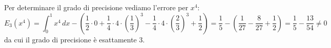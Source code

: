 \documentclass[a4paper,11pt]{article}
\begin{document}
Per determinare il grado di precisione vediamo l'errore per $x^4$:
$$
E_3(x^4) = \int_0^1 x^4 \, dx - \left( \frac{1}{2} \cdot 0 + \frac{1}{4} \cdot 4 \cdot \left( \frac{1}{3} \right)^3 - \frac{1}{4} \cdot 4 \cdot \left( \frac{2}{3} \right)^3 + \frac{1}{2} \right) = \frac{1}{5} - \left( \frac{1}{27} - \frac{8}{27} + \frac{1}{2} \right) = \frac{1}{5} - \frac{13}{54} \neq 0
$$
da cui il grado di precisione è esattamente 3.
\end{document}
